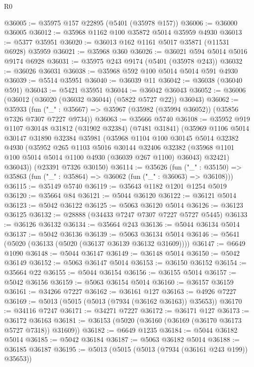 \begin{lexlean}{R0}
\begin{coremodule}
@36005 := @35975 @157 @22895 (@5401 (@35978 @157))
@36006 := @36000 @36005
@36012 := @35968 @1162 @100 @35872 @5014 @35959 @4930
@36013 := @5377 @35951
@36020 := @36013 @162 @1161 @5017 @35871 (@11531 @6928) @35959
@36021 := @35968 @360
@36026 := @36021 @594 @5014 @5016 @9174 @6928
@36031 := @35975 @243 @9174 (@5401 (@35978 @243))
@36032 := @36026 @36031
@36038 := @35968 @592 @100 @5014 @5014 @591 @4930
@36039 := @5514 @35951
@36040 := @36039 @11
@36042 := @36038 (@36040 @591)
@36043 := @5421 @35951
@36044 := @36042 @36043
@36052 := @36006 (@36012 (@36020 (@36032 @36044) (@5822 @5727 @22)) @36043)
@36062 := @35933
    (fun ("_" : @35667) => @35967 (@35982 (@35994 @36052)) (@35856 @7326 @7307 @7227 @9734))
@36063 := @35666 @5740
@36108 := @35952
    @919
    @1107
    @30148
    @31812
    (@31902 @32384)
    (@7481 @31841)
    (@35969
      @1106
      @5014
      @30147
      @31890
      @32384
      @35981
      (@35968
        @1104
        @100
        @30145
        @5014
        @32382
        @4930
        (@35952
          @265
          @1103
          @5016
          @30144
          @32406
          @32382
          (@35968 @1101 @100 @5014 @5014 @1100 @4930 (@36039 @267 @1100) @36043)
          @32421)
        @36043))
    (@23391 @7326 @30150)
@36114 := @35626
    (fun ("_" : @35150) => @35863 (fun ("_" : @35864) => @36062 (fun ("_" : @36063) => @36108)))
@36115 := @35149 @5740
@36119 := @35643 @1182 @1201 @1254 @5019
@36120 := @35664 @84
@36121 := @5044 @36120
@36122 := @36121 @5014
@36123 := @5042 @36122
@36125 := @5063 @36120 @5014
@36126 := @36123 @36125
@36132 := @28888 (@34433 @7247 @7307 @7227 @5727 @5445)
@36133 := @36126 @36132
@36134 := @35664 @243
@36136 := @5044 @36134 @5014
@36137 := @5042 @36136
@36139 := @5063 @36134 @5014
@36146 := @5641 (@5020 (@36133 (@5020 (@36137 @36139 @36132 @31609))))
@36147 := @6649 @1090
@36148 := @5044 @36147
@36149 := @36148 @5014
@36150 := @5042 @36149
@36152 := @5063 @36147 @5014
@36153 := @36150 @36152
@36154 := @35664 @22
@36155 := @5044 @36154
@36156 := @36155 @5014
@36157 := @5042 @36156
@36159 := @5063 @36154 @5014
@36160 := @36157 @36159
@36161 := @34266 @7227
@36162 := @36161 @127
@36163 := @4926 @7227
@36169 := @5013 (@5015 (@5013 (@7934 (@36162 @36163)) @35653))
@36170 := @34116 @7247
@36171 := @34271 @7227
@36172 := @36171 @127
@36173 := @36172 @36163
@36181 := @36153 (@5020 (@36160 (@36169 (@36170 @36173 @5727 @7318)) @31609))
@36182 := @6649 @1235
@36184 := @5044 @36182 @5014
@36185 := @5042 @36184
@36187 := @5063 @36182 @5014
@36188 := @36185 @36187
@36195 := @5013 (@5015 (@5013 (@7934 (@36161 @243 @199)) @35653))

\end{coremodule}
\end{lexlean}
